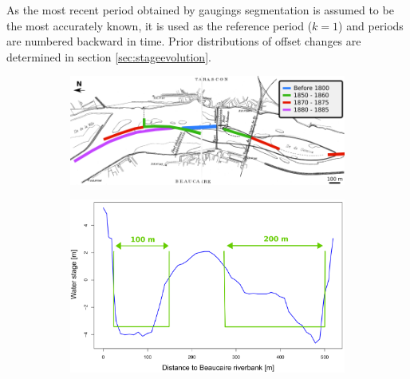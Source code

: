 \documentclass[11pt]{article}
\begin{document}
       As the most recent period obtained by gaugings segmentation is assumed to be the most accurately known, it is used as the reference period ($k=1$) and periods are numbered backward in time. Prior distributions of offset changes are determined in section \ref{sec:stageevolution}.       

        \begin{figure}[h!]
            \centering
            \begin{subfigure}{0.7\linewidth}
            \centering
            \includegraphics[width=1\linewidth]{Figs/3a-DiguesArmand.png}\hfill
            \caption{}
            \label{subfig:diguesarmand}
            \end{subfigure}
            
            \begin{subfigure}{0.6\linewidth}
            \centering
            \includegraphics[width=1\linewidth]{Figs/3b-MatrixChenal_EN.png}
            \caption{}
            \label{subfig:matrixCh}
            \end{subfigure}
            

\end{figure}
\end{document}
